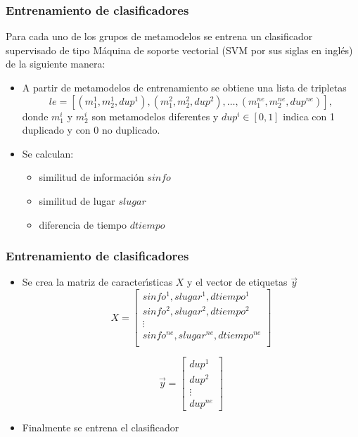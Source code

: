 \documentclass{beamer}
\begin{document}
\begin{frame}
  \frametitle{Entrenamiento de clasificadores}
  Para cada uno de los grupos de metamodelos se entrena un clasificador supervisado de tipo M\'{a}quina de soporte vectorial (SVM por sus siglas en ingl\'{e}s) de la siguiente manera:\\
  
  \begin{itemize}
  \item A partir de metamodelos de entrenamiento se obtiene una lista de tripletas \begin{equation}
      le = [(m_{1}^{1}, m_{2}^{1}, dup^{1}), (m_{1}^{2}, m_{2}^{2}, dup^{2}), \dots, (m_{1}^{ne}, m_{2}^{ne}, dup^{ne})],
    \end{equation} donde $m_{1}^{i}$ y $m_{2}^{i}$ son metamodelos diferentes y $dup^{i} \in [0,1]$ indica con 1 duplicado y con 0 no duplicado.
    \vspace{2 mm}
  \item Se calculan: 
    \begin{itemize}
    \item similitud de informaci\'{o}n $sinfo$
    \item similitud de lugar $slugar$
    \item diferencia de tiempo $dtiempo$ 
    \end{itemize}
  \end{itemize}
\end{frame}


\begin{frame}
  \frametitle{Entrenamiento de clasificadores}
  \begin{itemize}
  \item Se crea la matriz de caracter\'{\i}sticas $X$ y el vector de etiquetas $\vec{y}$
    \begin{equation} \label{matrizEntrenamientoClasificadores} 
      X = \begin{bmatrix}sinfo^{1},slugar^{1}, dtiempo^{1}\\
        sinfo^{2},slugar^{2}, dtiempo^{2}\\\vdots\\
        sinfo^{ne},slugar^{ne}, dtiempo^{ne}\\\end{bmatrix}
    \end{equation}
    
    \begin{equation} \label{vectorEtiquetasClasificadores}
      \vec{y} = \left[\begin{array}{c}dup^{1}\\dup^{2}\\\vdots\\dup^{ne}\end{array}\right]
    \end{equation}
    \vspace{2 mm}
  \item Finalmente se entrena el clasificador
  \end{itemize}
\end{frame}
\end{document}

